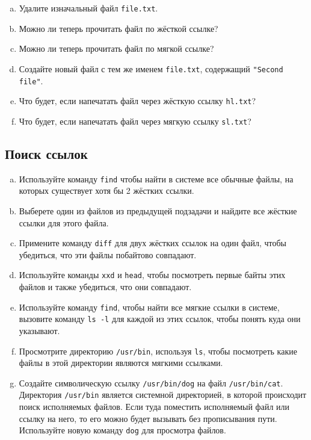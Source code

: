 \documentclass{article}
\begin{document}
\begin{enumerate}[(a)]
\item Удалите изначальный файл \texttt{file.txt}.
\item Можно ли теперь прочитать файл по жёсткой ссылке?
\item Можно ли теперь прочитать файл по мягкой ссылке?
\item Создайте новый файл с тем же именем \texttt{file.txt}, содержащий \texttt{"Second file"}.
\item Что будет, если напечатать файл через жёсткую ссылку \texttt{hl.txt}?
\item Что будет, если напечатать файл через мягкую ссылку \texttt{sl.txt}?
\end{enumerate}


\subsection{Поиск ссылок}
\begin{enumerate}[(a)]
\item Используйте команду \texttt{find} чтобы найти в системе все обычные файлы, на которых существует хотя бы 2 жёстких ссылки.
\item Выберете один из файлов из предыдущей подзадачи и найдите все жёсткие ссылки для этого файла.
\item Примените команду \texttt{diff} для двух жёстких ссылок на один файл, чтобы убедиться, что эти файлы побайтово совпадают.
\item Используйте команды \texttt{xxd} и \texttt{head}, чтобы посмотреть первые байты этих файлов и также убедиться, что они совпадают.
\item Используйте команду \texttt{find}, чтобы найти все мягкие ссылки в системе, вызовите команду \texttt{ls -l} для каждой из этих ссылок, чтобы понять куда они указывают.

\item Просмотрите директорию \texttt{/usr/bin}, используя \texttt{ls}, чтобы посмотреть какие файлы в этой директории являются мягкими ссылками.

\item Создайте символическую ссылку \texttt{/usr/bin/dog} на файл \texttt{/usr/bin/cat}. Директория \texttt{/usr/bin} является системной директорией, в которой происходит поиск исполняемых файлов. Если туда поместить исполняемый файл или ссылку на него, то его можно будет вызывать без прописывания пути. Используйте новую команду \texttt{dog} для просмотра файлов.
\end{enumerate}
\end{document}
